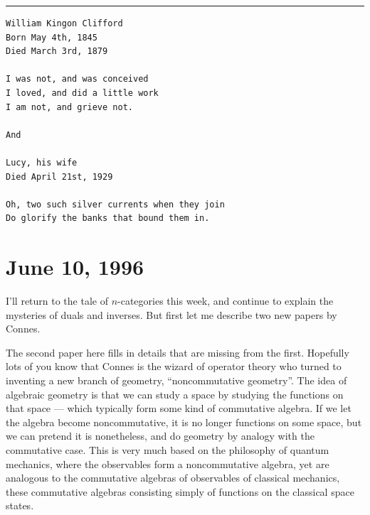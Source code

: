 \documentclass{article}
\renewcommand{\texttt}[1]{%
  \begingroup
  \ttfamily
  \begingroup\lccode`~=`/\lowercase{\endgroup\def~}{/\discretionary{}{}{}}%
  \begingroup\lccode`~=`[\lowercase{\endgroup\def~}{[\discretionary{}{}{}}%
  \begingroup\lccode`~=`.\lowercase{\endgroup\def~}{.\discretionary{}{}{}}%
  \catcode`/=\active\catcode`[=\active\catcode`.=\active
  \scantokens{#1\noexpand}%
  \endgroup
}
\begin{document}
\begin{center}\rule{0.5\linewidth}{0.5pt}\end{center}

\begin{verbatim}
William Kingon Clifford
Born May 4th, 1845
Died March 3rd, 1879

I was not, and was conceived
I loved, and did a little work
I am not, and grieve not.

And

Lucy, his wife
Died April 21st, 1929

Oh, two such silver currents when they join
Do glorify the banks that bound them in.
\end{verbatim}



\hypertarget{week83}{%
\section{June 10, 1996}\label{week83}}

I'll return to the tale of \(n\)-categories this week, and continue to
explain the mysteries of duals and inverses. But first let me describe
two new papers by Connes.


The second paper here fills in details that are missing from the first.
Hopefully lots of you know that Connes is the wizard of operator theory
who turned to inventing a new branch of geometry, ``noncommutative
geometry''. The idea of algebraic geometry is that we can study a space
by studying the functions on that space --- which typically form some
kind of commutative algebra. If we let the algebra become
noncommutative, it is no longer functions on some space, but we can
pretend it is nonetheless, and do geometry by analogy with the
commutative case. This is very much based on the philosophy of quantum
mechanics, where the observables form a noncommutative algebra, yet are
analogous to the commutative algebras of observables of classical
mechanics, these commutative algebras consisting simply of functions on
the classical space states.
\end{document}
